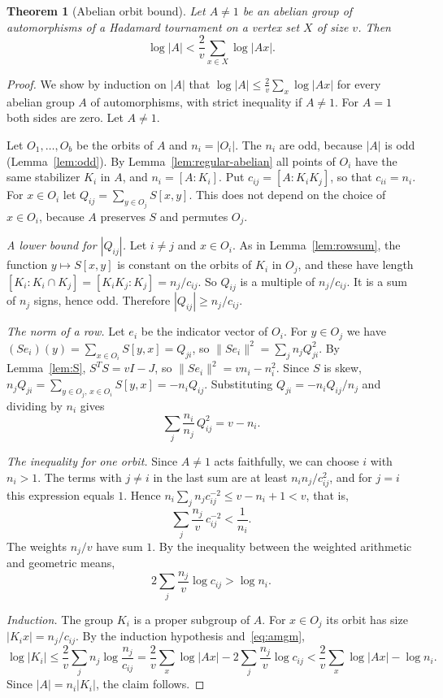 \documentclass[11pt]{amsart}
\newtheorem{theorem}{Theorem}
\theoremstyle{definition}
\theoremstyle{remark}
\begin{document}
\begin{theorem}[Abelian orbit bound]\label{thm:abelian}
Let $A\ne1$ be an abelian group of automorphisms of a Hadamard tournament on a vertex set $X$ of size $v$. Then
\[
\log|A|<\frac2v\sum_{x\in X}\log|Ax| .
\]
\end{theorem}
\begin{proof}
We show by induction on $|A|$ that $\log|A|\le\frac2v\sum_x\log|Ax|$ for every abelian group $A$ of automorphisms, with strict inequality if $A\ne1$. For $A=1$ both sides are zero. Let $A\ne1$.

Let $O_1,\dots,O_b$ be the orbits of $A$ and $n_i=|O_i|$. The $n_i$ are odd, because $|A|$ is odd (Lemma~\ref{lem:odd}). By Lemma~\ref{lem:regular-abelian} all points of $O_i$ have the same stabilizer $K_i$ in $A$, and $n_i=[A:K_i]$. Put $c_{ij}=[A:K_iK_j]$, so that $c_{ii}=n_i$. For $x\in O_i$ let $Q_{ij}=\sum_{y\in O_j}S[x,y]$. This does not depend on the choice of $x\in O_i$, because $A$ preserves $S$ and permutes $O_j$.

\emph{A lower bound for $|Q_{ij}|$.} Let $i\ne j$ and $x\in O_i$. As in Lemma~\ref{lem:rowsum}, the function $y\mapsto S[x,y]$ is constant on the orbits of $K_i$ in $O_j$, and these have length $[K_i:K_i\cap K_j]=[K_iK_j:K_j]=n_j/c_{ij}$. So $Q_{ij}$ is a multiple of $n_j/c_{ij}$. It is a sum of $n_j$ signs, hence odd. Therefore $|Q_{ij}|\ge n_j/c_{ij}$.

\emph{The norm of a row.} Let $e_i$ be the indicator vector of $O_i$. For $y\in O_j$ we have $(Se_i)(y)=\sum_{x\in O_i}S[y,x]=Q_{ji}$, so $\|Se_i\|^2=\sum_jn_jQ_{ji}^2$. By Lemma~\ref{lem:S}, $S^{T}S=vI-J$, so $\|Se_i\|^2=vn_i-n_i^2$. Since $S$ is skew, $n_jQ_{ji}=\sum_{y\in O_j,\,x\in O_i}S[y,x]=-n_iQ_{ij}$. Substituting $Q_{ji}=-n_iQ_{ij}/n_j$ and dividing by $n_i$ gives
\[
\sum_{j}\frac{n_i}{n_j}\,Q_{ij}^2=v-n_i .
\]

\emph{The inequality for one orbit.} Since $A\ne1$ acts faithfully, we can choose $i$ with $n_i>1$. The terms with $j\ne i$ in the last sum are at least $n_in_j/c_{ij}^2$, and for $j=i$ this expression equals $1$. Hence $n_i\sum_jn_jc_{ij}^{-2}\le v-n_i+1<v$, that is,
\[
\sum_j\frac{n_j}{v}\,c_{ij}^{-2}<\frac1{n_i} .
\]
The weights $n_j/v$ have sum $1$. By the inequality between the weighted arithmetic and geometric means,
\begin{equation}\label{eq:amgm}
2\sum_j\frac{n_j}{v}\log c_{ij}>\log n_i .
\end{equation}

\emph{Induction.} The group $K_i$ is a proper subgroup of $A$. For $x\in O_j$ its orbit has size $|K_ix|=n_j/c_{ij}$. By the induction hypothesis and~\eqref{eq:amgm},
\[
\log|K_i|\le\frac2v\sum_jn_j\log\frac{n_j}{c_{ij}}=\frac2v\sum_x\log|Ax|-2\sum_j\frac{n_j}{v}\log c_{ij}<\frac2v\sum_x\log|Ax|-\log n_i .
\]
Since $|A|=n_i|K_i|$, the claim follows.
\end{proof}
\end{document}
